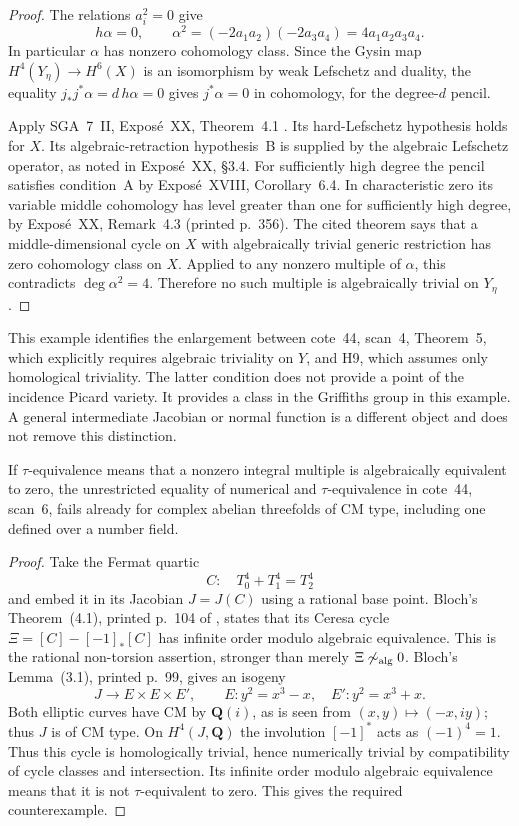 \begin{proof}
The relations $a_i^2=0$ give
\[
 h\alpha=0,
 \qquad
 \alpha^2=(-2a_1a_2)(-2a_3a_4)=4a_1a_2a_3a_4.
\]
In particular $\alpha$ has nonzero cohomology class.  Since the Gysin
map $H^4(Y_\eta)\to H^6(X)$ is an isomorphism by weak Lefschetz
and duality, the equality $j_*j^*\alpha=d\,h\alpha=0$ gives
$j^*\alpha=0$ in cohomology, for the degree-$d$ pencil.

Apply SGA~7~II, Expos\'e~XX, Theorem~4.1
\cite[printed p.~355]{SGA7II}.  Its hard-Lefschetz hypothesis holds
for $X$.  Its algebraic-retraction hypothesis~B is supplied by the
algebraic Lefschetz operator, as noted in Expos\'e~XX, \S3.4.
For sufficiently high degree the pencil satisfies condition~A by
Expos\'e~XVIII, Corollary~6.4.  In characteristic zero its variable
middle cohomology has level greater than one for sufficiently high
degree, by Expos\'e~XX, Remark~4.3 (printed p.~356).
The cited theorem says that a middle-dimensional cycle on $X$ with
algebraically trivial generic restriction has zero cohomology class
on $X$.  Applied to any nonzero multiple of $\alpha$, this contradicts
$\deg\alpha^2=4$.  Therefore no such multiple is algebraically
trivial on $Y_\eta$.
\end{proof}

This example identifies the enlargement between cote~44, scan~4,
Theorem~5, which explicitly requires algebraic triviality on $Y$,
and H9, which assumes only homological triviality.  The latter condition
does not provide a point of the incidence Picard variety.  It provides
a class in the Griffiths group in this example.  A general intermediate
Jacobian or normal function is a different object and does not remove
this distinction.

\begin{proposition}
\label{jac:P05}
If $\tau$-equivalence means that a nonzero integral multiple is
algebraically equivalent to zero, the unrestricted equality of numerical
and $\tau$-equivalence in cote~44, scan~6, fails already for complex
abelian threefolds of CM type, including one defined over a number field.
\end{proposition}

\begin{proof}
Take the Fermat quartic
\[
 C:\quad T_0^4+T_1^4=T_2^4
\]
and embed it in its Jacobian $J=J(C)$ using a rational base point.
Bloch's Theorem~(4.1), printed p.~104 of \cite{Bloch1984L}, states
that its Ceresa cycle $\Xi=[C]-[-1]_*[C]$ has infinite order modulo
algebraic equivalence.  This is the rational non-torsion assertion,
stronger than merely $\Xi\not\sim_{\rm alg}0$.
Bloch's Lemma~(3.1), printed p.~99, gives an isogeny
\[
 J\longrightarrow E\times E\times E',\qquad
 E:y^2=x^3-x,\quad E':y^2=x^3+x.
\]
Both elliptic curves have CM by $\mathbf Q(i)$, as is seen from
$(x,y)\mapsto(-x,iy)$; thus $J$ is of CM type.
On $H^4(J,\mathbf Q)$ the involution $[-1]^*$
acts as $(-1)^4=1$.  Thus this cycle is homologically trivial, hence
numerically trivial by compatibility of cycle classes and intersection.
Its infinite order modulo algebraic equivalence means that it is not
$\tau$-equivalent to zero.  This gives the required counterexample.
\end{proof}

